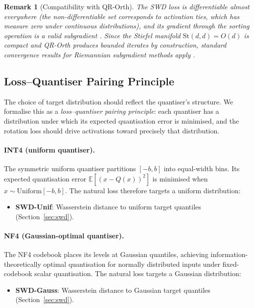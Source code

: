 \documentclass[11pt,a4paper]{article}
\newtheorem{remark}{Remark}
\begin{document}
\begin{remark}[Compatibility with QR-Orth]
\label{rem:qrorth}
The SWD loss is differentiable almost everywhere (the non-differentiable set corresponds to activation ties, which has measure zero under continuous distributions), and its gradient through the sorting operation is a valid subgradient \cite{blondel2020}.
Since the Stiefel manifold $\mathrm{St}(d, d) = O(d)$ is compact and QR-Orth produces bounded iterates by construction, standard convergence results for Riemannian subgradient methods apply \cite{li2021riemannian}.
\end{remark}

\subsection{Loss--Quantiser Pairing Principle}
\label{sec:pairing}

The choice of target distribution should reflect the quantiser's structure.
We formalise this as a \emph{loss--quantiser pairing principle}: each quantiser has a distribution under which its expected quantisation error is minimised, and the rotation loss should drive activations toward precisely that distribution.

\paragraph{INT4 (uniform quantiser).}
The symmetric uniform quantiser partitions $[-b, b]$ into equal-width bins.
Its expected quantisation error $\mathbb{E}[(x - Q(x))^2]$ is minimised when $x \sim \text{Uniform}[-b, b]$.
The natural loss therefore targets a uniform distribution:
\begin{itemize}
    \item \textbf{SWD-Unif}: Wasserstein distance to uniform target quantiles (Section~\ref{sec:swd}).
\end{itemize}

\paragraph{NF4 (Gaussian-optimal quantiser).}
The NF4 codebook \cite{qlora} places its levels at Gaussian quantiles, achieving information-theoretically optimal quantisation for normally distributed inputs under fixed-codebook scalar quantisation.
The natural loss targets a Gaussian distribution:
\begin{itemize}
    \item \textbf{SWD-Gauss}: Wasserstein distance to Gaussian target quantiles (Section~\ref{sec:swd}).
\end{itemize}
\end{document}
